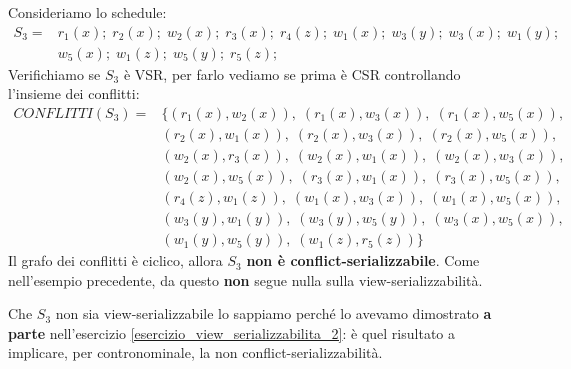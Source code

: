 \documentclass[a4paper,twoside]{article}
\begin{document}
\begin{example}
  Consideriamo lo schedule:
  \[
    \begin{aligned}
      S_3 =& r_1(x); \; r_2(x); \; w_2(x); \; r_3(x); \; r_4(z); \; w_1(x); \; w_3(y); \;
      w_3(x); \; w_1(y);\\
           &w_5(x); \; w_1(z); \; w_5(y); \; r_5(z);
    \end{aligned}
  \] 
  Verifichiamo se \( S_3 \) è VSR, per farlo vediamo se prima è CSR controllando
  l'insieme dei conflitti:
  \[
    \begin{aligned}
      CONFLITTI(S_3) =& \{
        (r_1(x), w_2(x)),\;
        (r_1(x), w_3(x)),\;
        (r_1(x), w_5(x)), \\
                      &(r_2(x), w_1(x)),\;
        (r_2(x), w_3(x)),\;
        (r_2(x), w_5(x)), \\
                      &(w_2(x), r_3(x)),\;
        (w_2(x), w_1(x)),\;
        (w_2(x), w_3(x)), \\
                      &(w_2(x), w_5(x)),\;
        (r_3(x), w_1(x)),\;
        (r_3(x), w_5(x)), \\
                      &(r_4(z), w_1(z)),\;
        (w_1(x), w_3(x)),\;
        (w_1(x), w_5(x)), \\
                      &(w_3(y), w_1(y)),\;
        (w_3(y), w_5(y)),\;
        (w_3(x), w_5(x)), \\
                      &(w_1(y), w_5(y)),\;
        (w_1(z), r_5(z))
      \} 
    \end{aligned}
  \] 
  Il grafo dei conflitti è ciclico, allora \( S_3 \) \textbf{non è conflict-serializzabile}.
  Come nell'esempio precedente, da questo \textbf{non} segue nulla sulla
  view-serializzabilità.

  \vspace{1em}
  \noindent
  Che \( S_3 \) non sia view-serializzabile lo sappiamo perché lo avevamo dimostrato
  \textbf{a parte} nell'esercizio \ref{esercizio_view_serializzabilita_2}: è quel
  risultato a implicare, per contronominale, la non conflict-serializzabilità.
\end{example}
\end{document}

